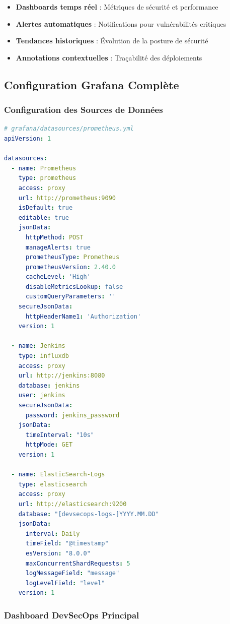 \documentclass[12pt,a4paper]{report}
\begin{document}
\begin{itemize}
    \item \textbf{Dashboards temps réel} : Métriques de sécurité et performance
    \item \textbf{Alertes automatiques} : Notifications pour vulnérabilités critiques
    \item \textbf{Tendances historiques} : Évolution de la posture de sécurité
    \item \textbf{Annotations contextuelles} : Traçabilité des déploiements
\end{itemize}

\subsection{Configuration Grafana Complète}

\subsubsection{Configuration des Sources de Données}

\begin{lstlisting}[language=yaml, caption=Configuration Prometheus datasource pour Grafana]
# grafana/datasources/prometheus.yml
apiVersion: 1

datasources:
  - name: Prometheus
    type: prometheus
    access: proxy
    url: http://prometheus:9090
    isDefault: true
    editable: true
    jsonData:
      httpMethod: POST
      manageAlerts: true
      prometheusType: Prometheus
      prometheusVersion: 2.40.0
      cacheLevel: 'High'
      disableMetricsLookup: false
      customQueryParameters: ''
    secureJsonData:
      httpHeaderName1: 'Authorization'
    version: 1

  - name: Jenkins
    type: influxdb
    access: proxy
    url: http://jenkins:8080
    database: jenkins
    user: jenkins
    secureJsonData:
      password: jenkins_password
    jsonData:
      timeInterval: "10s"
      httpMode: GET
    version: 1

  - name: ElasticSearch-Logs
    type: elasticsearch
    access: proxy
    url: http://elasticsearch:9200
    database: "[devsecops-logs-]YYYY.MM.DD"
    jsonData:
      interval: Daily
      timeField: "@timestamp"
      esVersion: "8.0.0"
      maxConcurrentShardRequests: 5
      logMessageField: "message"
      logLevelField: "level"
    version: 1
\end{lstlisting}

\subsubsection{Dashboard DevSecOps Principal}
\end{document}

